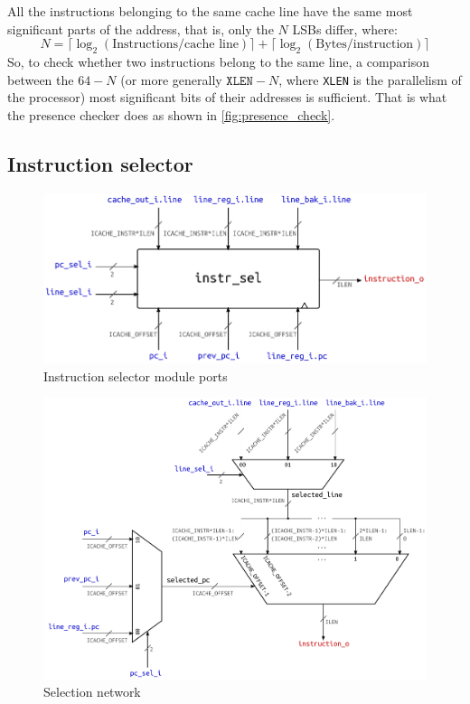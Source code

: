 All the instructions belonging to the same cache line have the same most significant parts of the address, that is, only the $N$ LSBs differ, where:
\begin{equation*}
  N = \lceil \log_2(\text{Instructions/cache line}) \rceil + 
      \lceil \log_2(\text{Bytes/instruction}) \rceil
\end{equation*}
So, to check whether two instructions belong to the same line, a comparison between the $64-N$ (or more generally $\texttt{XLEN}-N$, where \texttt{XLEN} is the parallelism of the processor) most significant bits of their addresses is sufficient. That is what the presence checker does as shown in \cref{fig:presence_check}.

\subsection{Instruction selector}
\begin{figure}[hbt]
  \centering
  \includegraphics{img/instr_sel-top.pdf}
  \caption{Instruction selector module ports}
  \label{fig:instr_sel-top}
\end{figure}
\begin{figure}[hbt]
  \includegraphics[width=\textwidth]{img/instr_sel.pdf}
  \caption{Selection network}
  \label{fig:instr_sel}
\end{figure}
